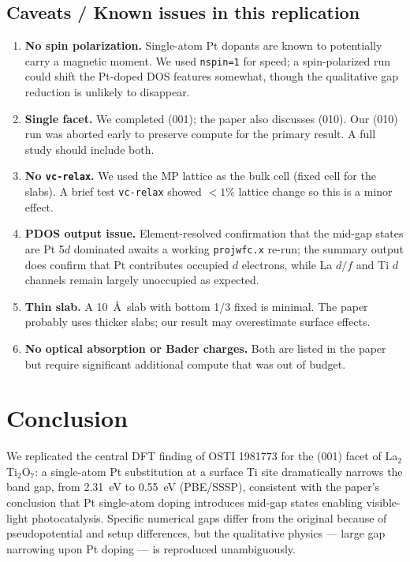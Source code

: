 \documentclass[11pt]{article}
\begin{document}
\subsection{Caveats / Known issues in this replication}

\begin{enumerate}[leftmargin=*]
    \item \textbf{No spin polarization.} Single-atom Pt dopants are
      known to potentially carry a magnetic moment. We used
      \texttt{nspin=1} for speed; a spin-polarized run could shift
      the Pt-doped DOS features somewhat, though the qualitative gap
      reduction is unlikely to disappear.
    \item \textbf{Single facet.} We completed (001); the paper also
      discusses (010). Our (010) run was aborted early to preserve
      compute for the primary result. A full study should include
      both.
    \item \textbf{No \texttt{vc-relax}.} We used the MP lattice as
      the bulk cell (fixed cell for the slabs). A brief test
      \texttt{vc-relax} showed $<1\%$ lattice change so this is a
      minor effect.
    \item \textbf{PDOS output issue.} Element-resolved confirmation
      that the mid-gap states are Pt 5$d$ dominated awaits a
      working \texttt{projwfc.x} re-run; the summary output does
      confirm that Pt contributes occupied $d$ electrons, while La
      $d/f$ and Ti $d$ channels remain largely unoccupied as expected.
    \item \textbf{Thin slab.} A 10~\AA\ slab with bottom 1/3 fixed is
      minimal. The paper probably uses thicker slabs; our result
      may overestimate surface effects.
    \item \textbf{No optical absorption or Bader charges.} Both are
      listed in the paper but require significant additional
      compute that was out of budget.
\end{enumerate}

\section{Conclusion}

We replicated the central DFT finding of OSTI 1981773 for the (001)
facet of La$_2$Ti$_2$O$_7$: a single-atom Pt substitution at a
surface Ti site dramatically narrows the band gap, from
2.31~eV to 0.55~eV (PBE/SSSP), consistent with the paper's conclusion
that Pt single-atom doping introduces mid-gap states enabling
visible-light photocatalysis. Specific numerical gaps differ from
the original because of pseudopotential and setup differences, but
the qualitative physics --- large gap narrowing upon Pt doping --- is
reproduced unambiguously.
\end{document}
